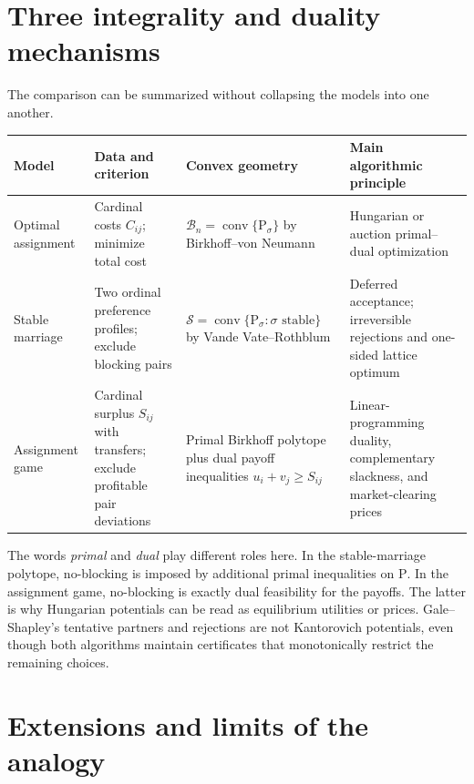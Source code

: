 \documentclass[11pt]{article}
\theoremstyle{definition}
\theoremstyle{remark}
\newcommand{\Pmat}{\mathrm P}
\newcommand{\Bcal}{\mathcal B}
\newcommand{\Scal}{\mathcal S}
\begin{document}
\section{Three integrality and duality mechanisms}
\label{sec:dictionary}

The comparison can be summarized without collapsing the models into one
another.

\begin{center}
\small
\renewcommand{\arraystretch}{1.35}
\begin{tabularx}{\textwidth}{>{\raggedright\arraybackslash}p{}
  >{\raggedright\arraybackslash}p{}
  >{\raggedright\arraybackslash}p{}
  >{\raggedright\arraybackslash}X}
\toprule
Model & Data and criterion & Convex geometry & Main algorithmic principle \\
\midrule
Optimal assignment & Cardinal costs \(C_{ij}\); minimize total cost &
\(\Bcal_n=\operatorname{conv}\{\Pmat_\sigma\}\) by Birkhoff--von Neumann &
Hungarian or auction primal--dual optimization \\
Stable marriage & Two ordinal preference profiles; exclude blocking pairs &
\(\Scal=\operatorname{conv}\{\Pmat_\sigma:\sigma\text{ stable}\}\) by
Vande Vate--Rothblum & Deferred acceptance; irreversible rejections and
one-sided lattice optimum \\
Assignment game & Cardinal surplus \(S_{ij}\) with transfers; exclude
profitable pair deviations & Primal Birkhoff polytope plus dual payoff
inequalities \(u_i+v_j\geq S_{ij}\) & Linear-programming duality,
complementary slackness, and market-clearing prices \\
\bottomrule
\end{tabularx}
\end{center}

The words \emph{primal} and \emph{dual} play different roles here. In the
stable-marriage polytope, no-blocking is imposed by additional primal
inequalities on \(\Pmat\). In the assignment game, no-blocking is exactly dual
feasibility for the payoffs. The latter is why Hungarian potentials can be
read as equilibrium utilities or prices. Gale--Shapley's tentative partners
and rejections are not Kantorovich potentials, even though both algorithms
maintain certificates that monotonically restrict the remaining choices.

\section{Extensions and limits of the analogy}
\label{sec:extensions}
\end{document}
